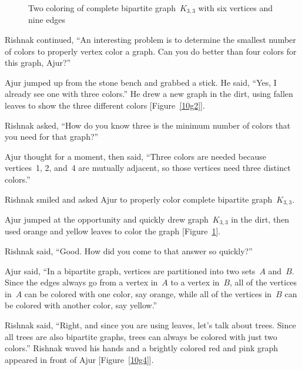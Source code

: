 \begin{figure}
\begin{center}
\caption{Two coloring of complete bipartite graph~$K_{3,3}$ with six vertices and nine edges}\label{10g3}
\end{center}
\end{figure}

Rishnak continued, ``An interesting problem is to determine the smallest number of colors to properly vertex color a graph. Can you do better than four colors for this graph, Ajur?''

Ajur jumped up from the stone bench and grabbed a stick. He said, ``Yes, I already see one with three colors.'' He drew a new graph in the dirt, using fallen leaves to show the three different colors [Figure~\ref{10g2}].

Rishnak asked, ``How do you know three is the minimum number of colors that you need for that graph?''

Ajur thought for a moment, then said, ``Three colors are needed because vertices~1, 2, and~4 are mutually adjacent, so those vertices need three distinct colors.''

Rishnak smiled and asked Ajur to properly color complete bipartite graph~$K_{3,3}$.

Ajur jumped at the opportunity and quickly drew graph~$K_{3,3}$ in the dirt, then used orange and yellow leaves to color the graph [Figure~\ref{10g3}].

Rishnak said, ``Good. How did you come to that answer so quickly?''

Ajur said, ``In a bipartite graph, vertices are partitioned into two sets~$A$ and~$B$. Since the edges always go from a vertex in~$A$ to a vertex in~$B$, all of the vertices in~$A$ can be colored with one color, say orange, while all of the vertices in~$B$ can be colored with another color, say yellow.''

Rishnak said, ``Right, and since you are using leaves, let's talk about trees. Since all trees are also bipartite graphs, trees can always be colored with just two colors.'' Rishnak waved his hands and a brightly colored red and pink graph appeared in front of Ajur [Figure~\ref{10g4}]. 

